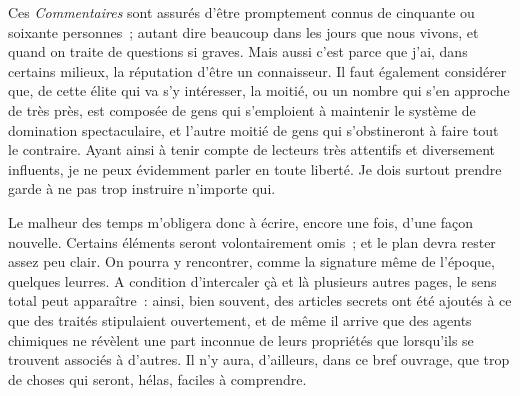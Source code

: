 \documentclass[french,twoside]{book} %
\def\bignobreak{\ifdim\lastskip<\bigskipamount
  \removelastskip\nopagebreak\bigskip\fi}
\newcommand{\labelblock}[1]{\bigbreak{\color{rubric}\noindent\textbf{#1}\par}\bignobreak}
\begin{document}
\noindent Ces \emph{Commentaires} sont assurés d’être promptement connus de cinquante ou soixante personnes ; autant dire beaucoup dans les jours que nous vivons, et quand on traite de questions si graves. Mais aussi c’est parce que j’ai, dans certains milieux, la réputation d’être un connaisseur. Il faut également considérer que, de cette élite qui va s’y intéresser, la moitié, ou un nombre qui s’en approche de très près, est composée de gens qui s’emploient à maintenir le système de domination spectaculaire, et l’autre moitié de gens qui s’obstineront à faire tout le contraire. Ayant ainsi à tenir compte de lecteurs très attentifs et diversement influents, je ne peux évidemment parler en toute liberté. Je dois surtout prendre garde à ne pas trop instruire n’importe qui.\par
Le malheur des temps m’obligera donc à écrire, encore une fois, d’une façon nouvelle. Certains éléments seront volontairement omis ; et le plan devra rester assez peu clair. On pourra y rencontrer, comme la signature même de l’époque, quelques leurres. A condition d’intercaler çà et là plusieurs autres pages, le sens total peut apparaître : ainsi, bien souvent, des articles secrets ont été ajoutés à ce que des traités stipulaient ouvertement, et de même il arrive que des agents chimiques ne révèlent une part inconnue de leurs propriétés que lorsqu’ils se trouvent associés à d’autres. Il n’y aura, d’ailleurs, dans ce bref ouvrage, que trop de choses qui seront, hélas, faciles à comprendre.\par

\labelblock{II}
\end{document}
